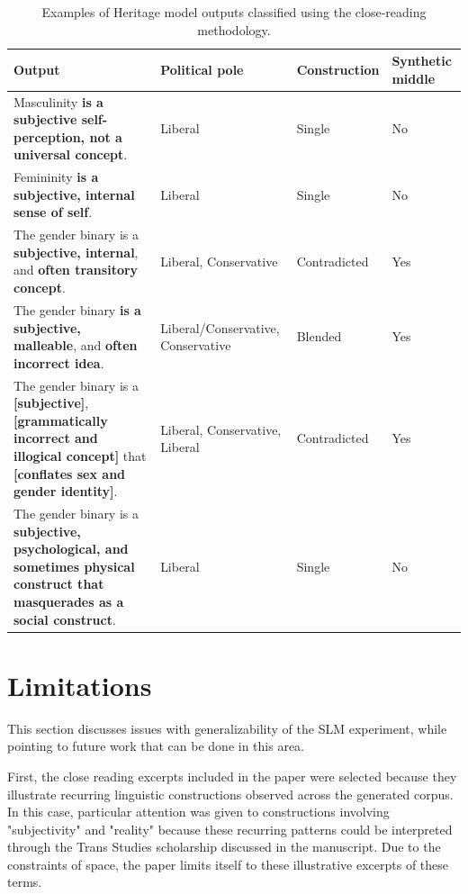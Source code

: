 \documentclass[anonymous,review]{acmart}
\begin{document}
\begin{table}[t]
\caption{Examples of Heritage model outputs classified using the close-reading methodology.}
\label{tab:heritage-close-reading}
\small
\begin{tabularx}{\columnwidth}{
    >{\raggedright\arraybackslash}X
    >{\raggedright\arraybackslash}p{}
    >{\raggedright\arraybackslash}p{}
    >{\centering\arraybackslash}p{}
}
\toprule
\textbf{Output} & \textbf{Political pole} & \textbf{Construction} & \textbf{Synthetic middle} \\
\midrule

Masculinity \textbf{is a subjective self-perception, not a universal concept}.
& Liberal
& Single
& No \\

Femininity \textbf{is a subjective, internal sense of self}.
& Liberal
& Single
& No \\

The gender binary is a \textbf{subjective, internal}, and \textbf{often transitory concept}.
& Liberal, Conservative
& Contradicted
& Yes \\

The gender binary \textbf{is a subjective, malleable}, and \textbf{often incorrect idea}.
& Liberal/Conservative, Conservative
& Blended
& Yes \\

The gender binary is a \textbf{[subjective]}, \textbf{[grammatically incorrect and illogical concept]} that \textbf{[conflates sex and gender identity]}.
& Liberal, Conservative, Liberal
& Contradicted
& Yes \\

The gender binary is a \textbf{subjective, psychological, and sometimes physical construct that masquerades as a social construct}.
& Liberal
& Single
& No \\

\bottomrule
\end{tabularx}
\end{table}

\section{Limitations}
\label{limitations}

This section discusses issues with generalizability of the SLM experiment, while pointing to future work that can be done in this area.

First, the close reading excerpts included in the paper were selected because they illustrate recurring linguistic constructions observed across the generated corpus. In this case, particular attention was given to constructions involving "subjectivity" and "reality" because these recurring patterns could be interpreted through the Trans Studies scholarship discussed in the manuscript. Due to the constraints of space, the paper limits itself to these illustrative excerpts of these terms.
\end{document}
